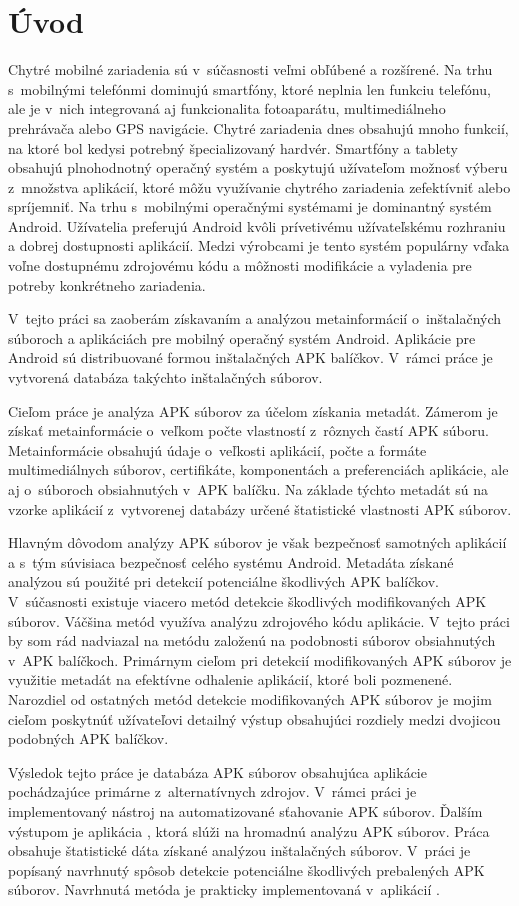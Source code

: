 \chapter{Úvod}
Chytré mobilné zariadenia sú v~súčasnosti veľmi obľúbené a rozšírené. Na trhu s~mobilnými telefónmi dominujú smartfóny, ktoré neplnia len funkciu telefónu, ale je v~nich integrovaná aj funkcionalita fotoaparátu, multimediálneho prehrávača alebo GPS navigácie. Chytré zariadenia dnes obsahujú mnoho funkcií, na ktoré bol kedysi potrebný špecializovaný hardvér. Smartfóny a tablety obsahujú plnohodnotný operačný systém a poskytujú užívateľom možnosť výberu z~množstva aplikácií, ktoré môžu využívanie chytrého zariadenia zefektívniť alebo spríjemniť. Na trhu s~mobilnými operačnými systémami je dominantný systém Android. Užívatelia preferujú Android kvôli prívetivému užívateľskému rozhraniu a dobrej dostupnosti aplikácií. Medzi výrobcami je tento systém populárny vďaka voľne dostupnému zdrojovému kódu a môžnosti modifikácie a vyladenia pre potreby konkrétneho zariadenia.

V~tejto práci sa zaoberám získavaním a analýzou metainformácií o~inštalačných súboroch a aplikáciách pre mobilný operačný systém Android. Aplikácie pre Android sú distribuované formou inštalačných APK balíčkov. V~rámci práce je vytvorená databáza takýchto inštalačných súborov. 

Cieľom práce je analýza APK súborov za účelom získania metadát. Zámerom je získať metainformácie o~veľkom počte vlastností z~rôznych častí APK súboru. Metainformácie obsahujú údaje o~veľkosti aplikácií, počte a formáte multimediálnych súborov, certifikáte, komponentách a preferenciách aplikácie, ale aj o~súboroch obsiahnutých v~APK balíčku. Na základe týchto metadát sú na vzorke aplikácií z~vytvorenej databázy určené štatistické vlastnosti APK súborov. 

Hlavným dôvodom analýzy APK súborov je však bezpečnosť samotných aplikácií a s~tým súvisiaca bezpečnosť celého systému Android. Metadáta získané analýzou sú použité pri detekcií potenciálne škodlivých APK balíčkov.
V~súčasnosti existuje viacero metód detekcie škodlivých modifikovaných APK  súborov. Váčšina metód využíva analýzu zdrojového kódu aplikácie. V~tejto práci by som rád nadviazal na metódu založenú na podobnosti súborov obsiahnutých v~APK balíčkoch.
Primárnym cieľom pri detekcií modifikovaných APK súborov je využitie metadát na efektívne odhalenie aplikácií, ktoré boli pozmenené. Narozdiel od ostatných metód detekcie modifikovaných APK súborov je mojim cieľom poskytnúť užívateľovi detailný výstup obsahujúci rozdiely medzi dvojicou podobných APK balíčkov.

Výsledok tejto práce je databáza APK súborov obsahujúca aplikácie pochádzajúce primárne z~alternatívnych zdrojov. V~rámci práci je implementovaný nástroj na automatizované sťahovanie APK súborov. Ďalším výstupom je aplikácia , ktorá slúži na hromadnú analýzu APK súborov. Práca obsahuje štatistické dáta získané analýzou inštalačných súborov. V~práci je popísaný navrhnutý spôsob detekcie potenciálne škodlivých prebalených APK súborov. Navrhnutá metóda je prakticky implementovaná v~aplikácií .